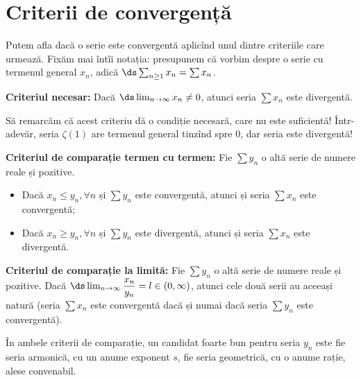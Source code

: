 \section{Criterii de convergență}

Putem afla dacă o serie este convergentă aplicînd unul dintre criteriile care urmează.
Fixăm mai întîi notația: presupunem că vorbim despre o serie cu termenul general
$ x_n $, adică $ \ds\sum_{n \geq 1} x_n = \sum x_n $.

\textbf{Criteriul necesar:} Dacă $ \ds\lim_{n \to \infty} x_n \neq 0 $, atunci
seria $ \sum x_n $ este divergentă.

\begin{remark}\label{rk:nec}
    Să remarcăm că acest criteriu dă o condiție necesară, care nu este suficientă!
    Într-adevăr, seria $ \zeta(1) $ are termenul general tinzînd spre 0, dar seria
    este divergentă!
\end{remark}

\vspace{1cm}

\textbf{Criteriul de comparație termen cu termen:} Fie $ \sum y_n $ o altă serie
de numere reale și pozitive.
\begin{itemize}
    \item Dacă $ x_n \leq y_n, \forall n $ și $ \sum y_n $ este convergentă,
        atunci și seria $ \sum x_n $ este convergentă;
    \item Dacă $ x_n \geq y_n, \forall n $ și $ \sum y_n $ este divergentă,
        atunci și seria $ \sum x_n $ este divergentă.
\end{itemize}

\vspace{1cm}

\textbf{Criteriul de comparație la limită:} Fie $ \sum y_n $ o altă serie
de numere reale și pozitive. Dacă $ \ds\lim_{n \to \infty} \dfrac{x_n}{y_n} = l \in (0, \infty) $,
atunci cele două serii au aceeași natură (seria $ \sum x_n $ este convergentă
dacă și numai dacă seria $ \sum y_n $ este convergentă).

\begin{remark}\label{rk:comparatie}
    În ambele criterii de comparație, un candidat foarte bun pentru seria $ y_n $
    este fie seria armonică, cu un anume exponent $ s $, fie seria geometrică,
    cu o anume rație, alese convenabil.
\end{remark}

